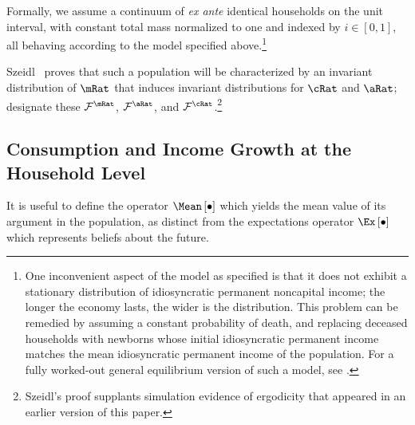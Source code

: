 \documentclass[BufferStockTheory]{subfiles}
\begin{document}
Formally, we assume a continuum of {\it ex ante} identical households
on the unit interval, with constant total mass normalized to one and
indexed by $i \in [0,1]$, all behaving according to the model
specified above.\footnote{One inconvenient aspect of the model as
  specified is that it does not exhibit a stationary distribution of
  idiosyncratic permanent noncapital income; the longer the economy lasts, the wider is the
  distribution.  This problem can be remedied by assuming a constant
  probability of death, and replacing deceased households with
  newborns whose initial idiosyncratic permanent income matches the
  mean idiosyncratic permanent income of the population.  For a fully
  worked-out general equilibrium version of such a model, see \cite{BSinKS}.}

Szeidl~\citeyearpar{szeidlInvariant} proves that such a
population will be characterized by an invariant
distribution of $\mRat$ that induces invariant distributions for $\cRat$ and
$\aRat$; designate these $\mathcal{F}^{\mRat}$, $\mathcal{F}^{\aRat}$, and
$\mathcal{F}^{\cRat}$.\footnote{Szeidl's proof supplants simulation evidence of ergodicity
  that appeared in an earlier version of this paper.}


\hypertarget{Consumption-and-Income-Growth-at-the-Household-Level}{}
\subsection{Consumption and Income Growth at the Household Level}

It is useful to define the operator $\Mean\left[\bullet\right]$
which yields the mean value of its argument in the population, as
distinct from the expectations operator $\Ex\left[\bullet\right]$ which represents beliefs about the
future.
\end{document}
